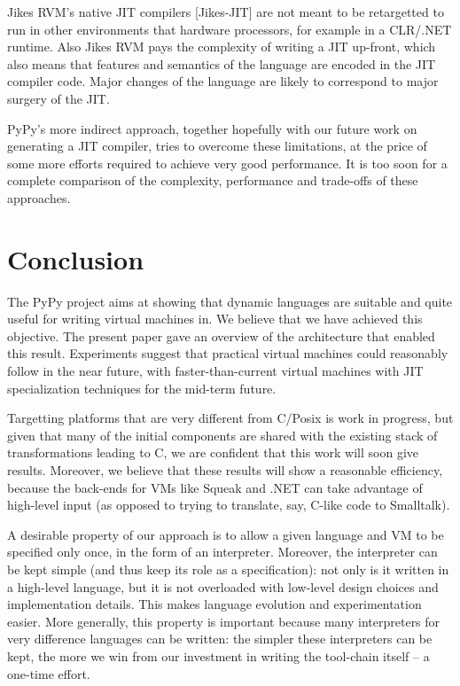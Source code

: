 \documentclass{acm_proc_article-sp}
\begin{document}
Jikes RVM's native JIT compilers [Jikes-JIT]
are not meant to be retargetted to run in other environments
that hardware processors, for example in a CLR/.NET
runtime. Also Jikes RVM pays the complexity of writing
a JIT up-front, which also means that features and semantics of the
language are encoded in the JIT compiler code.  Major changes of the
language are likely to correspond to major surgery of the JIT.

PyPy's more indirect approach, together hopefully with our future work
on generating a JIT compiler, tries to overcome these limitations, at
the price of some more efforts required to achieve very good
performance. It is too soon for a complete comparison of the complexity,
performance and trade-offs of these approaches.



\section{Conclusion}
\label{conclusion}


The PyPy project aims at showing that dynamic languages are suitable and
quite useful for writing virtual machines in.  We believe that we have
achieved this objective.  The present paper gave an overview of the
architecture that enabled this result.  Experiments suggest that
practical virtual machines could reasonably follow in the near future,
with faster-than-current virtual machines with JIT specialization
techniques for the mid-term future.

Targetting platforms that are very different from C/Posix is work in
progress, but given that many of the initial components are shared with
the existing stack of transformations leading to C, we are confident
that this work will soon give results.  Moreover, we believe that these
results will show a reasonable efficiency, because the back-ends for VMs
like Squeak and .NET can take advantage of high-level input (as opposed
to trying to translate, say, C-like code to Smalltalk).

A desirable property of our approach is to allow a given language and VM
to be specified only once, in the form of an interpreter.  Moreover, the
interpreter can be kept simple (and thus keep its role as a
specification): not only is it written in a high-level language, but it
is not overloaded with low-level design choices and implementation
details.  This makes language evolution and experimentation easier.
More generally, this property is important because many interpreters for
very difference languages can be written: the simpler these interpreters
can be kept, the more we win from our investment in writing the
tool-chain itself -- a one-time effort.
\end{document}
